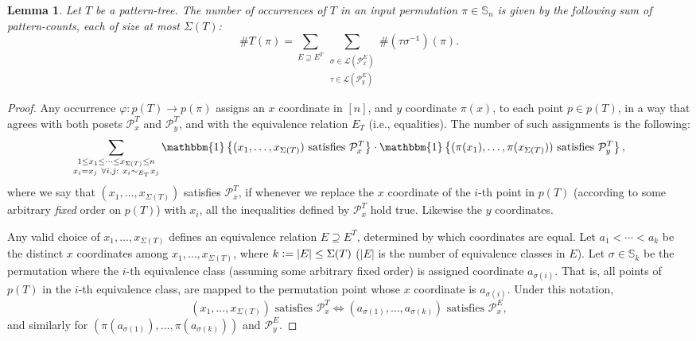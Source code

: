 \documentclass{article}
\newtheorem{lemma}[theorem]{Lemma}
\newcommand{\Sn}{\mathbb{S}_n}
\newcommand{\pc}[2]{{\# \mathtt{ #1 } \left( #2 \right)}}
\newcommand{\eqdef}{\vcentcolon=}
\theoremstyle{remark}
\theoremstyle{plain}
\begin{document}
\begin{lemma}
    \label{lem:pattern_tree_vec}
    Let $T$ be a pattern-tree.
    The number of occurrences of $T$ in an input permutation $\pi \in \Sn$ is given by the following sum of pattern-counts, each of size at most $\Sigma(T)$:
    \[
        \#T(\pi) = \sum_{ E \supseteq E^T } \sum_{ \substack{ \sigma \in \mathcal{L}(\mathcal{P}_x^{E}) \\ \tau \in \mathcal{L}(\mathcal{P}_y^{E}) } } \pc{\left(\tau \sigma^{-1}\right)}{\pi}.
    \]
\end{lemma}
\begin{proof} 
Any occurrence $\varphi:p(T)\to p(\pi)$ assigns an $x$ coordinate in $[n]$, and $y$ coordinate $\pi(x)$, to each point $p \in p(T)$, in a way that agrees with both posets $\mathcal{P}_{x}^{T}$ and $\mathcal{P}_{y}^{T}$, and with the equivalence relation $E_T$ (i.e., equalities). The number of such assignments is the following:
\[
    \sum_{\substack{1\le x_{1} \le \cdots \le x_{\Sigma(T)}\le n \\ x_i = x_j\ \forall i,j:\ x_i \sim_{E_T} x_j }}\mathbbm{1}\left\{\text{\ensuremath{(x_{1},\ldots,x_{\Sigma(T)})} satisfies \ensuremath{\mathcal{P}_{x}^{T}}}\right\}\cdot\mathbbm{1}\left\{\text{\ensuremath{(\pi(x_{1}),\ldots,\pi(x_{\Sigma(T)}))} satisfies \ensuremath{\mathcal{P}_{y}^{T}}}\right\},
\]
where we say that $(x_{1},\ldots,x_{\Sigma(T)})$ satisfies $\mathcal{P}_{x}^{T}$,
if whenever we replace the $x$ coordinate of the $i$-th point in $p(T)$
(according to some arbitrary \textit{fixed} order on $p(T)$) with $x_i$,
all the inequalities defined by $\mathcal{P}_{x}^{T}$ hold true. Likewise the $y$ coordinates.

Any valid choice of $x_{1},\ldots,x_{\Sigma(T)}$
defines an equivalence relation $E\supseteq E^{T}$, determined by which coordinates are equal.
Let $a_1 < \cdots < a_k$ be the distinct $x$ coordinates among $x_1, \ldots, x_{\Sigma(T)}$,
where $k \eqdef |E| \le \Sigma(T)$ ($|E|$ is the number of equivalence classes in $E$).
Let $\sigma\in\mathbb{S}_{k}$ be the permutation where the $i$-th equivalence class
(assuming some arbitrary fixed order) is assigned coordinate $a_{\sigma(i)}$.
That is, all points of $p(T)$ in the $i$-th equivalence class, are mapped to the permutation
point whose $x$ coordinate is $a_{\sigma(i)}$.
Under this notation, 
\[
    (x_{1},\ldots,x_{\Sigma(T)}) \text{ satisfies }\mathcal{P}_{x}^{T} \iff (a_{\sigma(1)},\ldots,a_{\sigma(k)}) \text{ satisfies }\mathcal{P}_{x}^{E},
\]
and similarly for $(\pi(a_{\sigma(1)}),\ldots,\pi(a_{\sigma(k)}))$ and $\mathcal{P}_{y}^{E}$. 


\end{proof}
\end{document}
